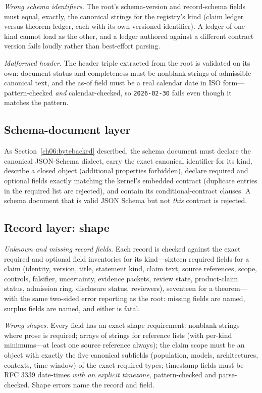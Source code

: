 \emph{Wrong schema identifiers.} The root's schema-version and
record-schema fields must equal, exactly, the canonical strings for the
registry's kind (claim ledger versus theorem ledger, each with its own
versioned identifier). A ledger of one kind cannot load as the other, and
a ledger authored against a different contract version fails loudly
rather than best-effort parsing.

\emph{Malformed header.} The header triple extracted from the root is
validated on its own: document status and completeness must be nonblank
strings of admissible canonical text, and the as-of field must be a real
calendar date in ISO form---pattern-checked \emph{and} calendar-checked,
so \texttt{2026-02-30} fails even though it matches the pattern.

\subsection{Schema-document layer}

As Section~\ref{ch06:bytebacked} described, the schema document must
declare the canonical JSON-Schema dialect, carry the exact canonical
identifier for its kind, describe a closed object (additional properties
forbidden), declare required and optional fields exactly matching the
kernel's embedded contract (duplicate entries in the required list are
rejected), and contain its conditional-contract clauses. A schema
document that is valid JSON Schema but not \emph{this} contract is
rejected.

\subsection{Record layer: shape}

\emph{Unknown and missing record fields.} Each record is checked against
the exact required and optional field inventories for its kind---sixteen
required fields for a claim (identity, version, title, statement kind,
claim text, source references, scope, controls, falsifier, uncertainty,
evidence packets, review state, product-claim status, admission ring,
disclosure status, reviewers), seventeen for a theorem---with the same
two-sided error reporting as the root: missing fields are named, surplus
fields are named, and either is fatal.

\emph{Wrong shapes.} Every field has an exact shape requirement: nonblank
strings where prose is required; arrays of strings for reference lists
(with per-kind minimums---at least one source reference always); the
claim scope must be an object with exactly the five canonical subfields
(population, models, architectures, contexts, time window) of the exact
required types; timestamp fields must be RFC 3339 date-times \emph{with
an explicit timezone}, pattern-checked and parse-checked. Shape errors
name the record and field.

